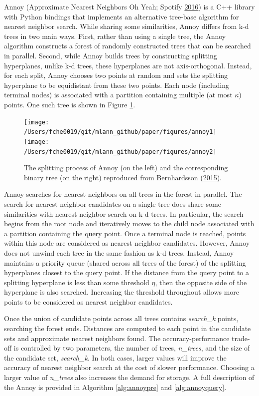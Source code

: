 \documentclass[12pt]{article}
\begin{document}
Annoy (Approximate Nearest Neighbors Oh Yeah; Spotify \protect\hyperlink{ref-Bernhardsson2016-tf}{2016}) is a C++ library with Python bindings that implements an alternative tree-base algorithm for nearest neighbor search. While sharing some similarities, Annoy differs from k-d trees in two main ways. First, rather than using a single tree, the Annoy algorithm constructs a forest of randomly constructed trees that can be searched in parallel. Second, while Annoy builds trees by constructing splitting hyperplanes, unlike k-d trees, these hyperplanes are not axis-orthogonal. Instead, for each split, Annoy chooses two points at random and sets the splitting hyperplane to be equidistant from these two points. Each node (including terminal nodes) is associated with a partition containing multiple (at most \(\kappa\)) points. One such tree is shown in Figure \ref{fig:annoy}.



\begin{figure}

{\centering \texttt{[image: /Users/fche0019/git/mlann\_github/paper/figures/annoy1]} \texttt{[image: /Users/fche0019/git/mlann\_github/paper/figures/annoy2]} 

}

\caption{The splitting process of Annoy (on the left) and the corresponding binary tree (on the right) reproduced from Bernhardsson (\protect\hyperlink{ref-Bernhardsson2015-slides}{2015}).}\label{fig:annoy}
\end{figure}

Annoy searches for nearest neighbors on all trees in the forest in parallel. The search for nearest neighbor candidates on a single tree does share some similarities with nearest neighbor search on k-d trees. In particular, the search begins from the root node and iteratively moves to the child node associated with a partition containing the query point. Once a terminal node is reached, points within this node are considered as nearest neighbor candidates. However, Annoy does not unwind each tree in the same fashion as k-d trees. Instead, Annoy maintains a priority queue (shared across all trees of the forest) of the splitting hyperplanes closest to the query point. If the distance from the query point to a splitting hyperplane is less than some threshold \(\eta\), then the opposite side of the hyperplane is also searched. Increasing the threshold throughout allows more points to be considered as nearest neighbor candidates.

Once the union of candidate points across all trees contains \textit{search\_k} points, searching the forest ends. Distances are computed to each point in the candidate sets and approximate nearest neighbors found. The accuracy-performance trade-off is controlled by two parameters, the number of trees, \textit{n\_trees}, and the size of the candidate set, \textit{search\_k}. In both cases, larger values will improve the accuracy of nearest neighbor search at the cost of slower performance. Choosing a larger value of \textit{n\_trees} also increases the demand for storage. A full description of the Annoy is provided in Algorithm \ref{alg:annoypre} and \ref{alg:annoyquery}.
\end{document}

